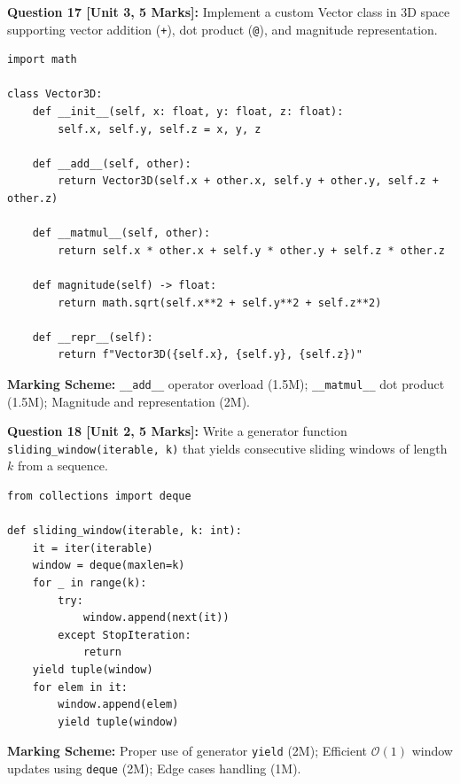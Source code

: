 \noindent\textbf{Question 17 [Unit 3, 5 Marks]:} Implement a custom Vector class in 3D space supporting vector addition (\texttt{+}), dot product (\texttt{@}), and magnitude representation.
\begin{solutionbox}
\begin{lstlisting}
import math

class Vector3D:
    def __init__(self, x: float, y: float, z: float):
        self.x, self.y, self.z = x, y, z

    def __add__(self, other):
        return Vector3D(self.x + other.x, self.y + other.y, self.z + other.z)

    def __matmul__(self, other):
        return self.x * other.x + self.y * other.y + self.z * other.z

    def magnitude(self) -> float:
        return math.sqrt(self.x**2 + self.y**2 + self.z**2)

    def __repr__(self):
        return f"Vector3D({self.x}, {self.y}, {self.z})"
\end{lstlisting}
\end{solutionbox}
\begin{markingrubric}
\textbf{Marking Scheme:} \texttt{\_\_add\_\_} operator overload (1.5M); \texttt{\_\_matmul\_\_} dot product (1.5M); Magnitude and representation (2M).
\end{markingrubric}

\noindent\textbf{Question 18 [Unit 2, 5 Marks]:} Write a generator function \texttt{sliding\_window(iterable, k)} that yields consecutive sliding windows of length $k$ from a sequence.
\begin{solutionbox}
\begin{lstlisting}
from collections import deque

def sliding_window(iterable, k: int):
    it = iter(iterable)
    window = deque(maxlen=k)
    for _ in range(k):
        try:
            window.append(next(it))
        except StopIteration:
            return
    yield tuple(window)
    for elem in it:
        window.append(elem)
        yield tuple(window)
\end{lstlisting}
\end{solutionbox}
\begin{markingrubric}
\textbf{Marking Scheme:} Proper use of generator \texttt{yield} (2M); Efficient $\mathcal{O}(1)$ window updates using \texttt{deque} (2M); Edge cases handling (1M).
\end{markingrubric}
